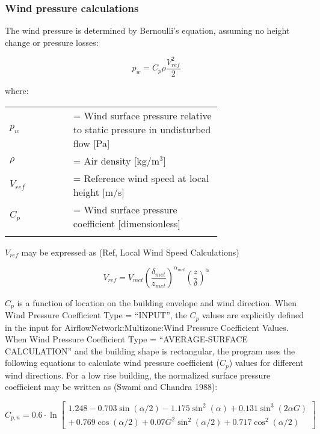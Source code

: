 \subsubsection{Wind pressure calculations}\label{wind-pressure-calculations}

The wind pressure is determined by Bernoulli's equation, assuming no height change or pressure losses:

\begin{equation}
p_w = C_p \rho \frac{V_{ref}^2}{2}
\end{equation}

where:

\begin{tabular}{lp{0.7\linewidth}}
\\
$p_w$ &= Wind surface pressure relative to static pressure in undisturbed flow [Pa]\\
$\rho$ &= Air density [kg/m\(^{3}\)]\\
$V_{ref}$ &= Reference wind speed at local height [m/s]\\
$C_p$ &= Wind surface pressure coefficient [dimensionless]\\
\\
\end{tabular}

$V_{ref}$ may be expressed as (Ref, Local Wind Speed Calculations)

\begin{equation}
V_{ref} = V_{met} \left( \frac{\delta_{met}}{z_{met}} \right)^{\alpha_{met}}\left( \frac{z}{\delta} \right)^\alpha
\end{equation}

$C_p$ is a function of location on the building envelope and wind direction. When Wind Pressure Coefficient Type = ``INPUT'', the $C_p$ values are explicitly defined in the input for AirflowNetwork:Multizone:Wind Pressure Coefficient Values. When Wind Pressure Coefficient Type = ``AVERAGE-SURFACE CALCULATION'' and the building shape is rectangular, the program uses the following equations to calculate wind pressure coefficient ($C_p$) values for different wind directions. For a low rise building, the normalized surface pressure coefficient may be written as (Swami and Chandra 1988):

\begin{equation}
C_{p,n} = 0.6 \cdot \ln \left[ \begin{array}{l}1.248 - 0.703\sin (\alpha /2) - 1.175{\sin ^2}(\alpha ) + 0.131{\sin ^3}(2\alpha G)\\ + \,0.769\cos (\alpha /2) + 0.07{G^2}{\sin ^2}(\alpha /2) + 0.717{\cos ^2}(\alpha /2)\end{array} \right]
\end{equation}

